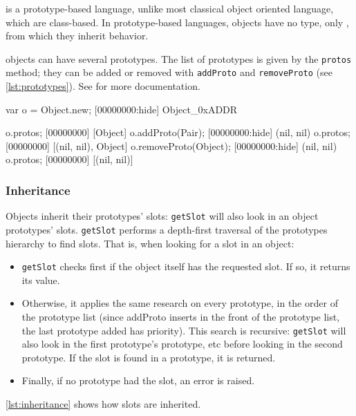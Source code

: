 \us is a prototype-based language, unlike most classical object
oriented language, which are class-based. In prototype-based
languages, objects have no type, only , from which they
inherit behavior.

\us objects can have several prototypes. The list of prototypes is
given by the \lstinline|protos| method; they can be added or removed
with \lstinline|addProto| and \lstinline|removeProto| (see
\autoref{lst:prototypes}).  See  for more
documentation.

\begin{urbiscript}[caption=Manipulating prototypes, label=lst:prototypes,
  float=\floatpos]
var o = Object.new;
[00000000:hide] Object_0xADDR

o.protos;
[00000000] [Object]
o.addProto(Pair);
[00000000:hide] (nil, nil)
o.protos;
[00000000] [(nil, nil), Object]
o.removeProto(Object);
[00000000:hide] (nil, nil)
o.protos;
[00000000] [(nil, nil)]
\end{urbiscript}

\subsubsection{Inheritance}

Objects inherit their prototypes' slots: \lstinline|getSlot| will also
look in an object prototypes' slots. \lstinline|getSlot| performs a
depth-first traversal of the prototypes hierarchy to find slots. That
is, when looking for a slot in an object:

\begin{itemize}
\item \lstinline|getSlot| checks first if the object itself has the
  requested slot. If so, it returns its value.
\item Otherwise, it applies the same research on every prototype, in
  the order of the prototype list (since addProto inserts in the front
  of the prototype list, the last prototype added has priority). This
  search is recursive: \lstinline|getSlot| will also look in the first
  prototype's prototype, etc before looking in the second
  prototype. If the slot is found in a prototype, it is returned.
\item Finally, if no prototype had the slot, an error is raised.
\end{itemize}

\autoref{lst:inheritance} shows how slots are inherited.

